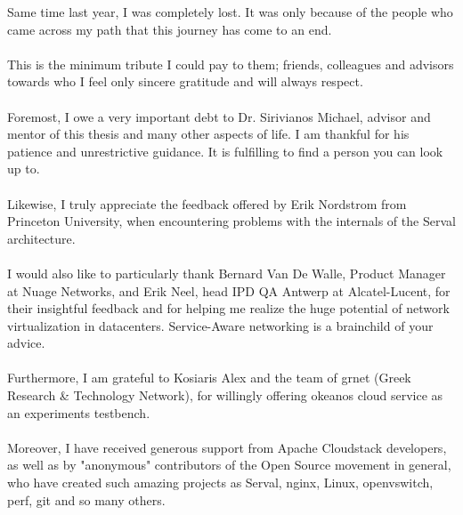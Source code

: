 Same time last year, I was completely lost.
It was only because of the people who came across my path that this journey has come to an end.

\paragraph{}
This is the minimum tribute I could pay to them; friends, colleagues and advisors towards who I feel only sincere gratitude and will always respect.

\paragraph{}
Foremost, I owe a very important debt to Dr. Sirivianos Michael, advisor and mentor of this thesis and many other aspects of life.
I am thankful for his patience and unrestrictive guidance.
It is fulfilling to find a person you can look up to.

\paragraph{}
Likewise, I truly appreciate the feedback offered by Erik Nordstrom from Princeton University, when encountering problems with the internals of the Serval architecture.

\paragraph{}
I would also like to particularly thank Bernard Van De Walle, Product Manager at Nuage Networks, and Erik Neel, head IPD QA Antwerp at Alcatel-Lucent, for their insightful feedback and for helping me realize the huge potential of network virtualization in datacenters.
Service-Aware networking is a brainchild of your advice.

\paragraph{}
Furthermore, I am grateful to Kosiaris Alex and the team of grnet (Greek Research \& Technology Network), for willingly offering okeanos cloud service as an experiments testbench.

\paragraph{}
Moreover, I have received generous support from Apache Cloudstack developers, as well as by "anonymous" contributors of the Open Source movement in general, who have created such amazing projects as Serval, nginx, Linux, openvswitch, perf, git and so many others.


